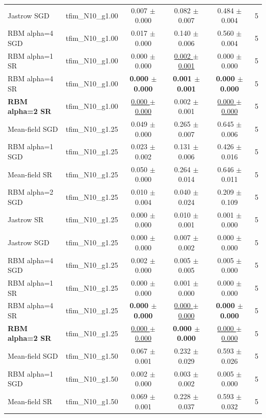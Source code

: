 \begin{tabular}{llcccc}
Jastrow SGD & tfim\_N10\_g1.00 & 0.007 $\pm$ 0.000 & 0.082 $\pm$ 0.007 & 0.484 $\pm$ 0.004 & 5 \\
RBM alpha=4 SGD & tfim\_N10\_g1.00 & 0.017 $\pm$ 0.000 & 0.140 $\pm$ 0.006 & 0.560 $\pm$ 0.004 & 5 \\
RBM alpha=1 SR & tfim\_N10\_g1.00 & 0.000 $\pm$ 0.000 & \underline{0.002 $\pm$ 0.001} & 0.000 $\pm$ 0.000 & 5 \\
RBM alpha=4 SR & tfim\_N10\_g1.00 & \textbf{0.000 $\pm$ 0.000} & \textbf{0.001 $\pm$ 0.001} & \textbf{0.000 $\pm$ 0.000} & 5 \\
\textbf{RBM alpha=2 SR} & tfim\_N10\_g1.00 & \underline{0.000 $\pm$ 0.000} & 0.002 $\pm$ 0.001 & \underline{0.000 $\pm$ 0.000} & 5 \\
\midrule
Mean-field SGD & tfim\_N10\_g1.25 & 0.049 $\pm$ 0.000 & 0.265 $\pm$ 0.007 & 0.645 $\pm$ 0.006 & 5 \\
RBM alpha=1 SGD & tfim\_N10\_g1.25 & 0.023 $\pm$ 0.002 & 0.131 $\pm$ 0.006 & 0.426 $\pm$ 0.016 & 5 \\
Mean-field SR & tfim\_N10\_g1.25 & 0.050 $\pm$ 0.000 & 0.264 $\pm$ 0.014 & 0.646 $\pm$ 0.011 & 5 \\
RBM alpha=2 SGD & tfim\_N10\_g1.25 & 0.010 $\pm$ 0.004 & 0.040 $\pm$ 0.024 & 0.209 $\pm$ 0.109 & 5 \\
Jastrow SR & tfim\_N10\_g1.25 & 0.000 $\pm$ 0.000 & 0.010 $\pm$ 0.001 & 0.001 $\pm$ 0.000 & 5 \\
Jastrow SGD & tfim\_N10\_g1.25 & 0.000 $\pm$ 0.000 & 0.007 $\pm$ 0.002 & 0.000 $\pm$ 0.000 & 5 \\
RBM alpha=4 SGD & tfim\_N10\_g1.25 & 0.002 $\pm$ 0.000 & 0.005 $\pm$ 0.005 & 0.005 $\pm$ 0.000 & 5 \\
RBM alpha=1 SR & tfim\_N10\_g1.25 & 0.000 $\pm$ 0.000 & 0.001 $\pm$ 0.000 & 0.000 $\pm$ 0.000 & 5 \\
RBM alpha=4 SR & tfim\_N10\_g1.25 & \textbf{0.000 $\pm$ 0.000} & \underline{0.000 $\pm$ 0.000} & \textbf{0.000 $\pm$ 0.000} & 5 \\
\textbf{RBM alpha=2 SR} & tfim\_N10\_g1.25 & \underline{0.000 $\pm$ 0.000} & \textbf{0.000 $\pm$ 0.000} & \underline{0.000 $\pm$ 0.000} & 5 \\
\midrule
Mean-field SGD & tfim\_N10\_g1.50 & 0.067 $\pm$ 0.001 & 0.232 $\pm$ 0.029 & 0.593 $\pm$ 0.026 & 5 \\
RBM alpha=1 SGD & tfim\_N10\_g1.50 & 0.002 $\pm$ 0.000 & 0.003 $\pm$ 0.002 & 0.005 $\pm$ 0.000 & 5 \\
Mean-field SR & tfim\_N10\_g1.50 & 0.069 $\pm$ 0.001 & 0.228 $\pm$ 0.037 & 0.593 $\pm$ 0.032 & 5 \\

\end{tabular}
